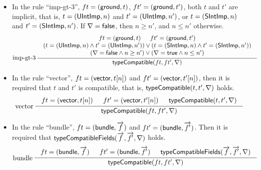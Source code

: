 \begin{itemize}
\begin{gather*}
{\begin{array}{c}
				(t = (\uint, n) \wedge t' = (\uintimp, n')) \vee (t = (\sint, n) \wedge t' = (\sintimp, n')) \\
				\flipped = \ltrue \rightarrow n \le n'
			\end{array}
		}	
	\end{gather*}
	\item In the rule ``imp-gt-3'',  $ft = ({\sf ground}, t)$, $ft' = ({\sf ground}, t')$, both $t$ and $t'$ are implicit, that is, $t= ({\sf UIntImp}, n)$ and $t' = ({\sf UIntImp}, n')$, or $t= ({\sf SIntImp}, n)$ and $t' = ({\sf SIntImp}, n')$.  If $\nabla = {\sf false}$, then $n \ge n'$, and $n \le n'$ otherwise. 
	\begin{gather*}
		\infer[imp-gt-3]
		{\typecompatible(ft, ft', \flipped)}
		{
			\begin{array}{c}
				ft = (\gtype, t) \hspace{15pt} ft' = (\gtype, t') \\
				(t = (\uintimp, n) \wedge t' = (\uintimp, n')) \vee (t = (\sintimp, n) \wedge t' = (\sintimp, n')) \\
				(\flipped = \lfalse \wedge n \ge n') \vee (\flipped = \ltrue \wedge n \le n')
			\end{array}
		}	
	\end{gather*}
	\item In the rule ``vector'', $ft = ({\sf vector}, t[n])$ and $ft' = ({\sf vector}, t'[n])$, then it is required that $t$ and $t'$ is compatible, that is, ${\sf typeCompatible}(t, t', \nabla)$ holds. 
	\begin{gather*}
		\infer[vector]
		{\typecompatible(ft, ft', \flipped)}
		{
			\begin{array}{c}
				ft = (\vtype, t[n]) \hspace{15pt} ft' = (\vtype, t'[n]) \hspace{15pt} \typecompatible(t, t', \flipped)
			\end{array}
		}	
	\end{gather*}
	\item In the rule ``bundle'', $ft = ({\sf bundle}, \overrightarrow{f})$ and $ft' = ({\sf bundle}, \overrightarrow{f'})$. Then it is required that ${\sf typeCompatibleFields}(\overrightarrow{f}, \overrightarrow{f'}, \nabla)$ holds. 
	\begin{gather*}
		\infer[bundle]
		{\typecompatible(ft, ft', \flipped)}
		{
		\begin{array}{c}
			ft = (\btype, \myvec{f}) \hspace{15pt} ft' = (\btype, \myvec{f'}) \hspace{15pt}  \typecompatiblefields(\myvec{f}, \myvec{f'}, \flipped)

\end{array}}
\end{gather*}
\end{itemize}
